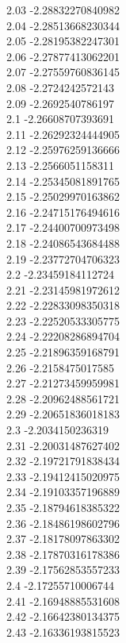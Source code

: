 {2.03	-2.28832270840982\\
2.04	-2.28513668230344\\
2.05	-2.28195382247301\\
2.06	-2.27877413062201\\
2.07	-2.27559760836145\\
2.08	-2.2724242572143\\
2.09	-2.2692540786197\\
2.1	-2.26608707393691\\
2.11	-2.26292324444905\\
2.12	-2.25976259136666\\
2.13	-2.2566051158311\\
2.14	-2.25345081891765\\
2.15	-2.25029970163862\\
2.16	-2.24715176494616\\
2.17	-2.24400700973498\\
2.18	-2.24086543684488\\
2.19	-2.23772704706323\\
2.2	-2.23459184112724\\
2.21	-2.23145981972612\\
2.22	-2.22833098350318\\
2.23	-2.22520533305775\\
2.24	-2.22208286894704\\
2.25	-2.21896359168791\\
2.26	-2.2158475017585\\
2.27	-2.21273459959981\\
2.28	-2.20962488561721\\
2.29	-2.20651836018183\\
2.3	-2.2034150236319\\
2.31	-2.20031487627402\\
2.32	-2.19721791838434\\
2.33	-2.19412415020975\\
2.34	-2.19103357196889\\
2.35	-2.18794618385322\\
2.36	-2.18486198602796\\
2.37	-2.18178097863302\\
2.38	-2.17870316178386\\
2.39	-2.17562853557233\\
2.4	-2.17255710006744\\
2.41	-2.16948885531608\\
2.42	-2.16642380134375\\
2.43	-2.16336193815523\\
}
